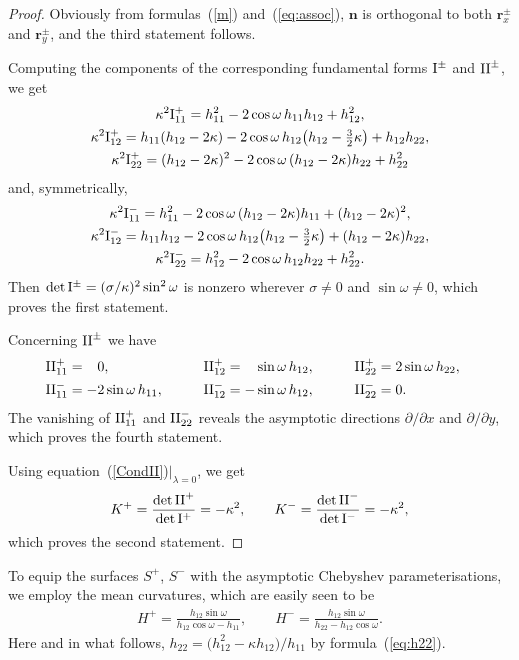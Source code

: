 \documentclass[pdftex]{sigma}
\let\ve\mathbf
\def\h#1#2{h_{#1#2}}
\def\f{\omega}
\def\k{\kappa}
\def\l{\lambda}
\def\hm{\hphantom{-}}
\def\eqref#1{{\rm(\ref{#1})}}
\numberwithin{equation}{section}
\begin{document}
\begin{proof}
Obviously from formulas~\eqref{m} and~\eqref{eq:assoc},
$\ve n$ is orthogonal to both $\ve r^\pm_x$ and $\ve r^\pm_y$,
and the third statement follows.

Computing the components of the corresponding fundamental forms ${\rm I}^\pm$ and ${\rm II}^\pm$,
we get
\begin{gather*}
\k^2 {\rm I}^+_{11} = \h11^2 - 2 \cos\f\,\h11\h12 + \h12^2, \\
\k^2 {\rm I}^+_{12} = \h11 (\h12 - 2 \k)
 - 2 \cos\f\,\h12 \bigl(\h12 - \tfrac32 \k\bigr) + \h12 \h22, \\
\k^2 {\rm I}^+_{22} = (\h12 - 2 \k)^2 - 2 \cos\f\,(\h12 - 2 \k)\h22 + \h22^2
\end{gather*}
and, symmetrically,
\begin{gather*}
\k^2 {\rm I}^-_{11} = \h11^2 - 2 \cos\f\,(\h12 - 2 \k)\h11
 + (\h12 - 2 \k)^2, \\
\k^2 {\rm I}^-_{12} = \h11 \h12 - 2 \cos\f\,\h12 \bigl(\h12 - \tfrac32 \k\bigr)
 + (\h12 - 2 \k)\h22, \\
\k^2 {\rm I}^-_{22} = \h12^2 - 2 \cos\f\,\h12\h22 + \h22^2.
\end{gather*}
Then $\det {\rm I}^\pm = (\sigma/\k)^2 \sin^2\omega$ is nonzero
wherever $\sigma \ne 0$ and $\sin\omega \ne 0$, which proves the first statement.

Concerning ${\rm II}^\pm$ we have
\begin{alignat*}{4}
&{\rm II}^+_{11} = \hm 0,\qquad && {\rm II}^+_{12} = \hm \sin\f\,\h12,\qquad &&
{\rm II}^+_{22} = 2 \sin\f\,\h22, &\\
&{\rm II}^-_{11} = -2 \sin\f\,\h11,\qquad && {\rm II}^-_{12} = -\sin\f\,\h12,\qquad &&
{\rm II}^-_{22} = 0.&
\end{alignat*}
The vanishing of ${\rm II}^+_{11}$ and ${\rm II}^-_{22}$ reveals the asymptotic directions
$\partial/\partial x$ and $\partial/\partial y$, which proves the fourth statement.

Using equation~\eqref{CondII}$|_{\l = 0}$, we get
\[
K^+ = \frac{\det {\rm II}^+}{\det {\rm I}^+} = -\k^2,
\qquad
K^- = \frac{\det {\rm II}^-}{\det {\rm I}^-} = -\k^2,
\]
which proves the second statement.
\end{proof}

To equip the surfaces $S^+$, $S^-$ with the
asymptotic Chebyshev parameterisations,
we employ the mean curvatures, which are easily seen to be
\begin{gather}\label{Hab}
H^+ = \frac{\h12 \sin\f}{\h12 \cos\f - \h11},
\qquad H^- = \frac{\h12 \sin\f}{\h22 - \h12 \cos\f}.
\end{gather}
Here and in what follows,
$\h22 = \bigl(\h12^2- \k\h12\bigr)/\h11$
by formula~\eqref{eq:h22}.
\end{document}
